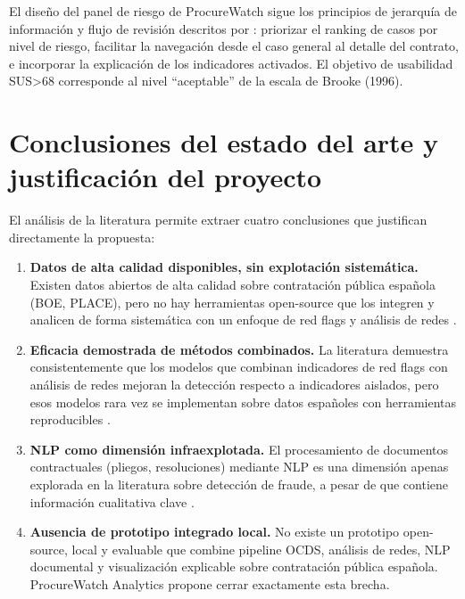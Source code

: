 \documentclass[11pt,a4paper,spanish]{book}
\numberwithin{equation}{chapter}
\numberwithin{figure}{chapter}
\begin{document}
El dise{\~n}o del panel de riesgo de ProcureWatch sigue los principios de jerarqu{\'i}a de informaci{\'o}n y flujo de revisi{\'o}n descritos por : priorizar el ranking de casos por nivel de riesgo, facilitar la navegaci{\'o}n desde el caso general al detalle del contrato, e incorporar la explicaci{\'o}n de los indicadores activados. El objetivo de usabilidad SUS\textgreater68 corresponde al nivel ``aceptable'' de la escala de Brooke (1996).

\section{Conclusiones del estado del arte y justificaci{\'o}n del proyecto}

El an{\'a}lisis de la literatura permite extraer cuatro conclusiones que justifican directamente la propuesta:

\begin{enumerate}
  \item \textbf{Datos de alta calidad disponibles, sin explotaci{\'o}n sistem{\'a}tica.} Existen datos abiertos de alta calidad sobre contrataci{\'o}n p{\'u}blica espa{\~n}ola (BOE, PLACE), pero no hay herramientas open-source que los integren y analicen de forma sistem{\'a}tica con un enfoque de red flags y an{\'a}lisis de redes \cite{MunozPla2026,OCP2023EUOpenData}.

  \item \textbf{Eficacia demostrada de m{\'e}todos combinados.} La literatura demuestra consistentemente que los modelos que combinan indicadores de red flags con an{\'a}lisis de redes mejoran la detecci{\'o}n respecto a indicadores aislados, pero esos modelos rara vez se implementan sobre datos espa{\~n}oles con herramientas reproducibles \cite{Wachs2025ML,Coviello2023Italian,Fazekas2020DIGIWHIST}.

  \item \textbf{NLP como dimensi{\'o}n infraexplotada.} El procesamiento de documentos contractuales (pliegos, resoluciones) mediante NLP es una dimensi{\'o}n apenas explorada en la literatura sobre detecci{\'o}n de fraude, a pesar de que contiene informaci{\'o}n cualitativa clave \cite{NLPLegalSurvey2024}.

  \item \textbf{Ausencia de prototipo integrado local.} No existe un prototipo open-source, local y evaluable que combine pipeline OCDS, an{\'a}lisis de redes, NLP documental y visualizaci{\'o}n explicable sobre contrataci{\'o}n p{\'u}blica espa{\~n}ola. ProcureWatch Analytics propone cerrar exactamente esta brecha.
\end{enumerate}
\end{document}
